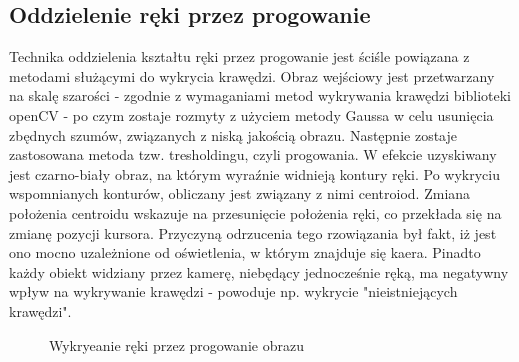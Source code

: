 \documentclass[a4paper,12pt]{article}
\begin{document}
\subsection{Oddzielenie ręki przez progowanie}
Technika oddzielenia kształtu ręki przez progowanie jest ściśle powiązana z metodami służącymi do wykrycia krawędzi. Obraz wejściowy jest przetwarzany na skalę szarości - zgodnie z wymaganiami metod wykrywania krawędzi biblioteki openCV - po czym zostaje rozmyty z użyciem metody Gaussa w celu usunięcia zbędnych szumów, związanych z niską jakością obrazu. Następnie zostaje zastosowana metoda tzw. tresholdingu, czyli progowania. W efekcie uzyskiwany jest czarno-biały obraz, na którym wyraźnie widnieją kontury ręki. Po wykryciu wspomnianych konturów, obliczany jest związany z nimi centroiod. Zmiana położenia centroidu wskazuje na przesunięcie położenia ręki, co przekłada się na zmianę pozycji kursora. 
Przyczyną odrzucenia tego rzowiązania był fakt, iż jest ono mocno uzależnione od oświetlenia, w którym znajduje się kaera. Pinadto każdy obiekt widziany przez kamerę, niebędący jednocześnie ręką, ma negatywny wpływ na wykrywanie krawędzi - powoduje np. wykrycie "nieistniejących krawędzi".  
\begin{figure}
\centering
{}
\quad
{}
\caption{Wykryeanie ręki przez progowanie obrazu}
\label{fig:animals}
\end{figure}
\end{document}
